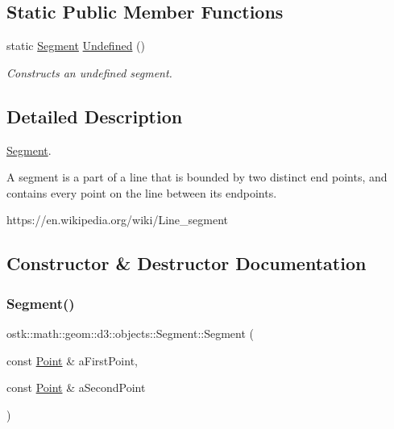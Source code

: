 \subsection*{Static Public Member Functions}
\begin{DoxyCompactItemize}
\item 
static \hyperlink{classostk_1_1math_1_1geom_1_1d3_1_1objects_1_1_segment}{Segment} \hyperlink{classostk_1_1math_1_1geom_1_1d3_1_1objects_1_1_segment_a488c219e6e6a137981df83b9d247f2bf}{Undefined} ()
\begin{DoxyCompactList}\small\item\em Constructs an undefined segment. \end{DoxyCompactList}\end{DoxyCompactItemize}


\subsection{Detailed Description}
\hyperlink{classostk_1_1math_1_1geom_1_1d3_1_1objects_1_1_segment}{Segment}. 

A segment is a part of a line that is bounded by two distinct end points, and contains every point on the line between its endpoints.

https\+://en.wikipedia.\+org/wiki/\+Line\+\_\+segment 

\subsection{Constructor \& Destructor Documentation}
\mbox{\label{classostk_1_1math_1_1geom_1_1d3_1_1objects_1_1_segment_aa2cb60ce06335a5f76120c658219494c}} 
\subsubsection{\texorpdfstring{Segment()}{Segment()}}
{\footnotesize\ttfamily ostk\+::math\+::geom\+::d3\+::objects\+::\+Segment\+::\+Segment (\begin{DoxyParamCaption}\item[{const \hyperlink{classostk_1_1math_1_1geom_1_1d3_1_1objects_1_1_point}{Point} \&}]{a\+First\+Point,  }\item[{const \hyperlink{classostk_1_1math_1_1geom_1_1d3_1_1objects_1_1_point}{Point} \&}]{a\+Second\+Point }\end{DoxyParamCaption})}



